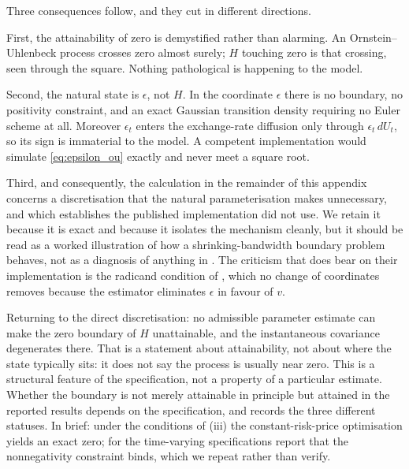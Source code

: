 \documentclass[11pt]{article}
\theoremstyle{definition}
\begin{document}
Three consequences follow, and they cut in different directions.

First, the attainability of zero is demystified rather than alarming. An Ornstein--Uhlenbeck process crosses zero almost surely; $H$ touching zero is that crossing, seen through the square. Nothing pathological is happening to the model.

Second, the natural state is $\epsilon$, not $H$. In the coordinate $\epsilon$ there is no boundary, no positivity constraint, and an exact Gaussian transition density requiring no Euler scheme at all. Moreover $\epsilon_t$ enters the exchange-rate diffusion only through $\epsilon_t\,dU_t$, so its sign is immaterial to the model. A competent implementation would simulate \eqref{eq:epsilon_ou} exactly and never meet a square root.

Third, and consequently, the calculation in the remainder of this appendix concerns a discretisation that the natural parameterisation makes unnecessary, and which  establishes the published implementation did not use. We retain it because it is exact and because it isolates the mechanism cleanly, but it should be read as a worked illustration of how a shrinking-bandwidth boundary problem behaves, not as a diagnosis of anything in \citet{BrandtSantaClara2002}. The criticism that does bear on their implementation is the radicand condition of , which no change of coordinates removes because the estimator eliminates $\epsilon$ in favour of $v$.

Returning to the direct discretisation: no admissible parameter estimate can make the zero boundary of $H$ unattainable, and the instantaneous covariance degenerates there. That is a statement about attainability, not about where the state typically sits: it does not say the process is usually near zero. This is a structural feature of the specification, not a property of a particular estimate. Whether the boundary is not merely attainable in principle but attained in the reported results depends on the specification, and  records the three different statuses. In brief: under the conditions of (iii) the constant-risk-price optimisation yields an exact zero; for the time-varying specifications \citet{BrandtSantaClara2002} report that the nonnegativity constraint binds, which we repeat rather than verify.
\end{document}
